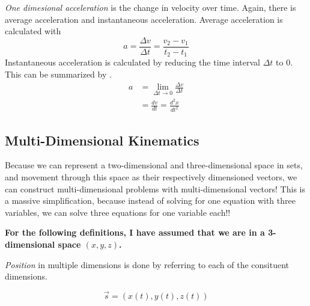 \begin{definition}[Acceleration] \label{def:1-D Acceleration}
  \emph{One dimesional acceleration} is the change in velocity over time.
  Again, there is average acceleration and instantaneous acceleration.
  Average acceleration is calculated with 
  \begin{equation} \label{eq:1-D Average Acceleration}
    a = \frac{\Delta v}{\Delta t} = \frac{v_{2} - v_{1}}{t_{2} - t_{1}}
  \end{equation}
  Instantaneous acceleration is calculated by reducing the time interval $\Delta t$ to 0.
  This can be summarized by .
  \begin{equation} \label{eq:1-D Instantaneous Acceleration}
    \begin{aligned}
      a &= \lim\limits_{\Delta t \rightarrow 0} \frac{\Delta v}{\Delta t} \\
      &= \frac{dv}{dt} = \frac{d^{2}x}{dt^{2}}
    \end{aligned}
  \end{equation}
\end{definition}

\subsection{Multi-Dimensional Kinematics} \label{Multi-D Kinematics}
Because we can represent a two-dimensional and three-dimensional space in sets, and movement through this space as their respectively dimensioned vectors, we can construct multi-dimensional problems with multi-dimensional vectors!
This is a massive simplification, because instead of solving for one equation with three variables, we can solve three equations for one variable each!!

\textbf{For the following definitions, I have assumed that we are in a 3-dimensional space $(x, y, z)$.}

\begin{definition} \label{Multi-D Position}
  \emph{Position} in multiple dimensions is done by referring to each of the consituent dimensions.

  \begin{equation} \label{eq:Multi-D Position}
    \vec{s} = \left( x(t), y(t), z(t) \right)
  \end{equation}
\end{definition}

